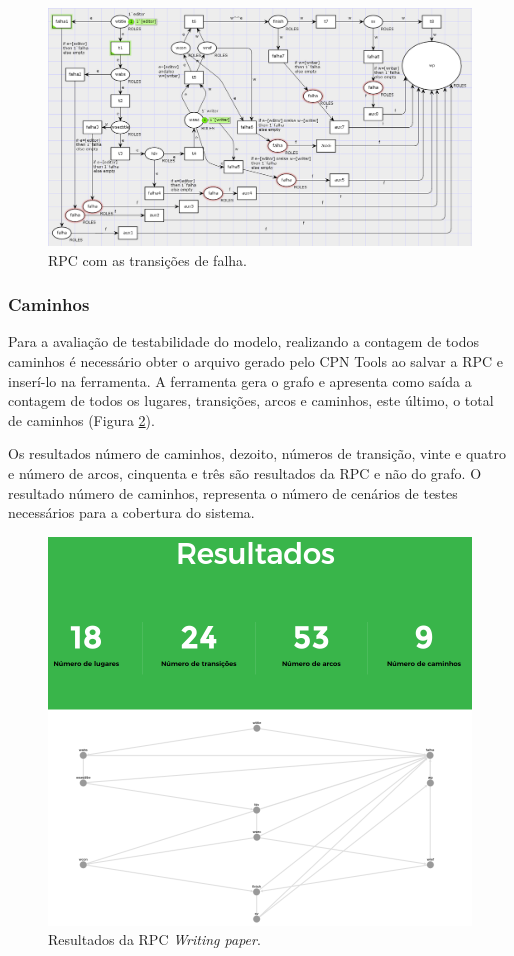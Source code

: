 \begin{figure}
\centering
\includegraphics[scale=0.65]{imagens/5-implementacao1.png}
\caption{RPC com as transições de falha.}
\label{fig:5rpcfinal1}
\end{figure}

\subsubsection{Caminhos}

Para a avaliação de testabilidade do modelo, realizando a contagem de todos caminhos é necessário obter o arquivo gerado pelo CPN Tools ao salvar a RPC e inserí-lo na ferramenta. A ferramenta gera o grafo e apresenta como saída a contagem de todos os lugares, transições, arcos e caminhos, este último, o total de caminhos (Figura \ref{fig:5-resultado1}).

Os resultados número de caminhos, dezoito, números de transição, vinte e quatro e número de arcos, cinquenta e três são resultados da RPC e não do grafo. O resultado número de caminhos, representa o número de cenários de testes necessários para a cobertura do sistema.

\begin{figure}[ht]
\centering
\includegraphics[scale=0.3]{imagens/5-resultado1.png}
\caption{Resultados da RPC \textit{Writing paper}.}
\label{fig:5-resultado1}
\end{figure}
    
